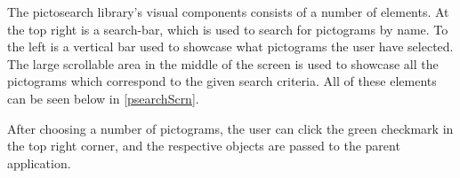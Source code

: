 The pictosearch library's visual components consists of a number of
elements. At the top right is a search-bar, which is used to search for
pictograms by name. To the left is a vertical bar used to showcase what
pictograms the user have selected. The large scrollable area in the middle of
the screen is used to showcase all the pictograms which correspond to the given
search criteria. All of these elements can be seen below in
\autoref{psearchScrn}.
 

After choosing a number of pictograms, the user can click the green checkmark in
the top right corner, and the respective  objects are passed to
the parent application.